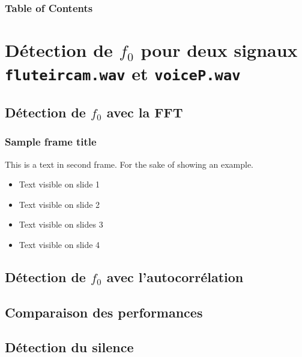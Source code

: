 \frame{\titlepage}

\begin{frame}
\frametitle{Table of Contents}
\tableofcontents
\end{frame}


\section{Détection de $f_{0}$ pour deux signaux \texttt{fluteircam.wav} et \texttt{voiceP.wav}}
\subsection{Détection de $f_{0}$ avec la FFT}

\begin{frame}
\frametitle{Sample frame title}
This is a text in second frame. For the sake of showing an example.

\begin{itemize}
    \item<1-> Text visible on slide 1
    \item<2-> Text visible on slide 2
    \item<3> Text visible on slides 3
    \item<4-> Text visible on slide 4
\end{itemize}
\end{frame}

\subsection{Détection de $f_{0}$ avec l'autocorrélation}

\begin{frame}
    
\end{frame}

\subsection{Comparaison des performances}

\begin{frame}
    
\end{frame}

\subsection{Détection du silence}

